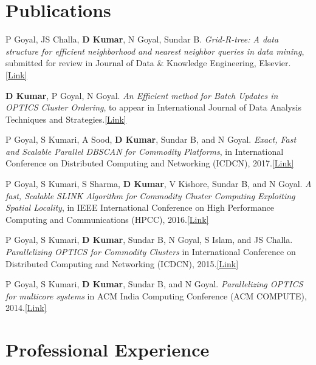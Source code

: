 \documentclass[margin,line]{res}
\begin{document}
\begin{resume}
\section{\sc Publications}
P Goyal, JS Challa, {\bf D Kumar}, N Goyal, Sundar B.
{\it Grid-R-tree: A data structure for efficient neighborhood and nearest neighbor queries in
data mining}, submitted for review in Journal of Data \& Knowledge Engineering, Elsevier.\href{https://drive.google.com/open?id=0B5R2WFoF983oN2dCcDJfaE9nVHM}{\color{blue}[Link]}

{\bf D Kumar}, P Goyal, N Goyal. {\it An Efficient method for Batch Updates in OPTICS Cluster Ordering}, to appear in International Journal of Data Analysis Techniques and
Strategies.\href{https://drive.google.com/open?id=0B5R2WFoF983oUmRrTWlBeWlQNWs}{\color{blue}[Link]}

P Goyal, S Kumari, A Sood, {\bf  D Kumar}, Sundar B, and N Goyal. {\it Exact, Fast and Scalable Parallel DBSCAN for Commodity Platforms}, in International Conference on Distributed Computing and Networking
(ICDCN), 2017.\href{https://dl.acm.org/citation.cfm?id=3007773}{\color{blue}[Link]}

P Goyal, S Kumari, S Sharma, {\bf D Kumar}, V Kishore, Sundar
B, and N Goyal. {\it A fast, Scalable SLINK Algorithm for Commodity
Cluster Computing Exploiting Spatial Locality}, in IEEE International Conference on High Performance Computing and Communications (HPCC), 2016.\href{http://ieeexplore.ieee.org/document/7828388/}{\color{blue}[Link]}

P Goyal, S Kumari, {\bf D Kumar}, Sundar B, N Goyal, S Islam, and JS Challa. {\it Parallelizing OPTICS for Commodity Clusters} in International Conference on Distributed Computing and Networking (ICDCN), 2015.\href{http://dl.acm.org/citation.cfm?id=2684477}{\color{blue}[Link]}

P Goyal, S Kumari, {\bf D Kumar}, Sundar B, and N Goyal.
{\it Parallelizing OPTICS for multicore systems} in ACM India Computing
Conference (ACM COMPUTE), 2014.\href{http://dl.acm.org/citation.cfm?id=2675763}{\color{blue}[Link]}

\section{\sc Professional Experience}




\end{resume}
\end{document}
